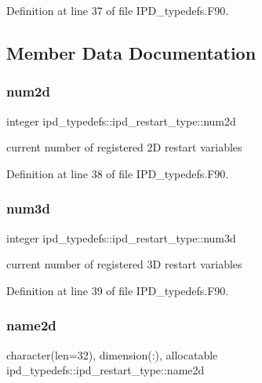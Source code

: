 Definition at line 37 of file I\+P\+D\+\_\+typedefs.\+F90.



\subsection{Member Data Documentation}
\mbox{\label{structipd__typedefs_1_1ipd__restart__type_af24e39917e0cbf35a55dcc80300eba57}} 
\subsubsection{num2d}
{\footnotesize\ttfamily integer ipd\+\_\+typedefs\+::ipd\+\_\+restart\+\_\+type\+::num2d}



current number of registered 2D restart variables 



Definition at line 38 of file I\+P\+D\+\_\+typedefs.\+F90.

\mbox{\label{structipd__typedefs_1_1ipd__restart__type_a8b9453de49da6dc2eec3f1b8d67b16f9}} 
\subsubsection{num3d}
{\footnotesize\ttfamily integer ipd\+\_\+typedefs\+::ipd\+\_\+restart\+\_\+type\+::num3d}



current number of registered 3D restart variables 



Definition at line 39 of file I\+P\+D\+\_\+typedefs.\+F90.

\mbox{\label{structipd__typedefs_1_1ipd__restart__type_a4c21d56e0bd0e98807a997059ca344e6}} 
\subsubsection{name2d}
{\footnotesize\ttfamily character(len=32), dimension(\+:), allocatable ipd\+\_\+typedefs\+::ipd\+\_\+restart\+\_\+type\+::name2d}



